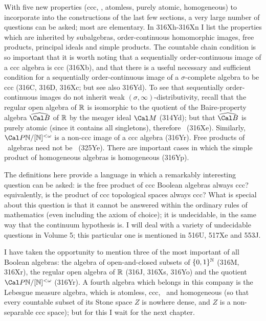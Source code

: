 {With five new properties (ccc, \wsid, atomless, purely atomic,
homogeneous) to
incorporate into the constructions of the last few sections, a very
large number of questions can be asked;   most are elementary.
In 316Xh-316Xn    %
I list the properties which are inherited by subalgebras, order-continuous
homomorphic images, free products, principal ideals and simple products.
The countable chain
condition is so important that it is worth noting that a sequentially
order-continuous image of a ccc algebra is ccc (316Xb), and that there
is a useful necessary and sufficient condition for a sequentially
order-continuous image of a $\sigma$-complete algebra to be ccc (316C,
316D, 316Xc;  but see also 316Yd).   To see that sequentially
order-continuous images do not inherit weak
$(\sigma,\infty)$-distributivity, recall that the regular open algebra
of $\Bbb R$ is isomorphic to the quotient of the
Baire-property algebra $\widehat{\Cal B}$ of $\Bbb R$ by the meager
ideal $\Cal M$
(314Yd);  but that $\widehat{\Cal B}$ is purely atomic (since it
contains all singletons), therefore \wsid\ (316Xe).   Similarly,
$\Cal P\Bbb N/[\Bbb N]^{<\omega}$ is a non-ccc image of a ccc algebra
(316Yr).   Free products of \wsid\ algebras need not be \wsid\ (325Ye).
There are important cases in which the simple product of homogeneous
algebras is homogeneous (316Yp).

The definitions here provide a language in which a remarkably
interesting question can be asked:  is the free product of ccc Boolean
algebras always
ccc?   equivalently, is the product of ccc topological spaces always
ccc?   What is special about this question is that it cannot be answered
within the ordinary rules of mathematics (even including the axiom of
choice);  it is
undecidable, in the same way that the continuum hypothesis is.   I will
deal with a variety of undecidable questions in Volume 5;  this particular
one is mentioned in 516U, 517Xe and 553J.

I have taken the opportunity to mention three of the most important of
all Boolean algebras:  the algebra of open-and-closed subsets of
$\{0,1\}^{\Bbb N}$ (316M, 316Xr),
the regular open algebra of $\Bbb R$ (316J, 316Xs, 316Yo) and the quotient
$\Cal P\Bbb N/[\Bbb N]^{<\omega}$ (316Yr).   A fourth algebra which
belongs in
this company is the Lebesgue measure algebra, which is atomless, ccc,
\wsid\ and homogeneous (so that
every countable subset of its Stone space $Z$ is nowhere dense, and $Z$
is a non-separable ccc space);  but for this I wait for the next
chapter.
}%

\frnewpage
